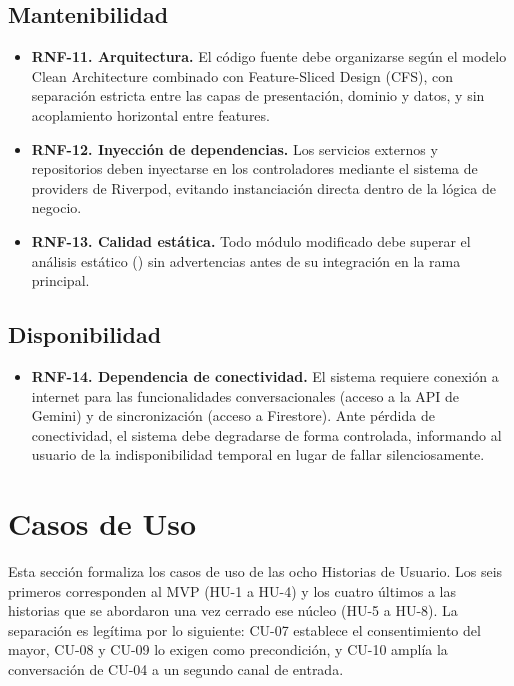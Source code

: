 \subsection*{Mantenibilidad}
\begin{itemize}
    \item \textbf{RNF-11. Arquitectura.} El código fuente debe organizarse según el modelo Clean
    Architecture combinado con Feature-Sliced Design (CFS), con separación estricta entre las capas de
    presentación, dominio y datos, y sin acoplamiento horizontal entre features.
    \item \textbf{RNF-12. Inyección de dependencias.} Los servicios externos y repositorios deben
    inyectarse en los controladores mediante el sistema de providers de Riverpod, evitando instanciación
    directa dentro de la lógica de negocio.
    \item \textbf{RNF-13. Calidad estática.} Todo módulo modificado debe superar el análisis estático
    () sin advertencias antes de su integración en la rama principal.
\end{itemize}

\subsection*{Disponibilidad}
\begin{itemize}
    \item \textbf{RNF-14. Dependencia de conectividad.} El sistema requiere conexión a internet para las
    funcionalidades conversacionales (acceso a la API de Gemini) y de sincronización (acceso a Firestore).
    Ante pérdida de conectividad, el sistema debe degradarse de forma controlada, informando al usuario de
    la indisponibilidad temporal en lugar de fallar silenciosamente.
\end{itemize}

\section{Casos de Uso}
\label{sec:casos-de-uso}
Esta sección formaliza los casos de uso de las ocho Historias de Usuario. Los seis primeros corresponden al
MVP (HU-1 a HU-4) y los cuatro últimos a las historias que se abordaron una vez cerrado ese núcleo (HU-5 a
HU-8). La separación es legítima por lo siguiente: CU-07 establece el consentimiento del mayor, CU-08 y CU-09 lo exigen
como precondición, y CU-10 amplía la conversación de CU-04 a un segundo canal de entrada.

